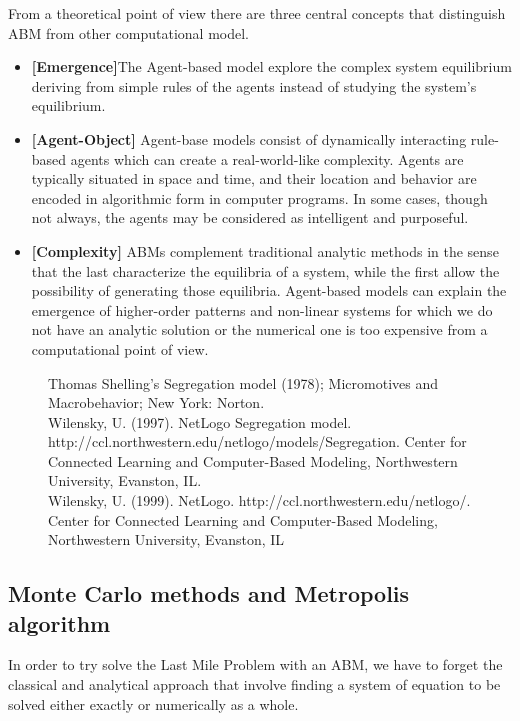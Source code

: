 \documentclass[11pt,a4paper]{article}
\begin{document}
From a theoretical point of view there are three central concepts that distinguish ABM from other computational model. 
\begin{itemize}
\item \textbf{[Emergence]}The Agent-based model explore the complex system equilibrium deriving from simple rules of the agents instead of studying the system's equilibrium.
\item \textbf{[Agent-Object]} Agent-base models consist of dynamically interacting rule-based agents which can create a real-world-like complexity. 
Agents are typically situated in space and time, and their location and behavior are encoded in algorithmic form in computer programs. 
In some cases, though not always, the agents may be considered as intelligent and purposeful.
\item \textbf{[Complexity]} ABMs complement traditional analytic methods in the sense that the last characterize the equilibria of a system, while the first  allow the possibility of generating those equilibria. 
Agent-based models can explain the emergence of higher-order patterns and non-linear systems for which we do not have an analytic solution or the numerical one is too expensive from a computational point of view.
\end{itemize}

\newpage
\begin{figure}[h!]
\centering
\caption{Thomas Shelling's Segregation model (1978); Micromotives and Macrobehavior; New York: Norton. \\
Wilensky, U. (1997). NetLogo Segregation model. http://ccl.northwestern.edu/netlogo/models/Segregation. Center for Connected Learning and Computer-Based Modeling, Northwestern University, Evanston, IL.\\
Wilensky, U. (1999). NetLogo. http://ccl.northwestern.edu/netlogo/. Center for Connected Learning and Computer-Based Modeling, Northwestern University, Evanston, IL}
\end{figure}
 
\subsection{Monte Carlo methods and Metropolis algorithm}
In order to try solve the Last Mile Problem with an ABM, we have to forget the classical and analytical approach that involve finding a system of equation to be solved either exactly or numerically as a whole.
\end{document}
